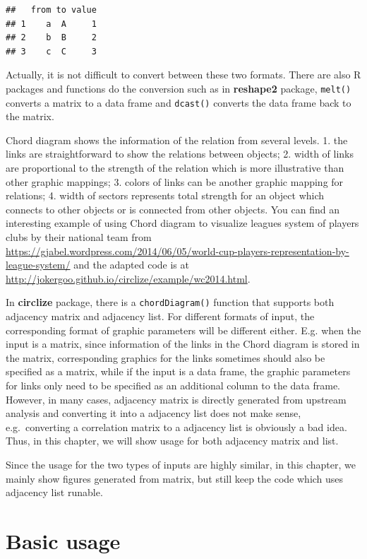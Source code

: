 \documentclass[]{book}
\begin{document}
\begin{verbatim}
##   from to value
## 1    a  A     1
## 2    b  B     2
## 3    c  C     3
\end{verbatim}

Actually, it is not difficult to convert between these two formats.
There are also R packages and functions do the conversion such as in
\textbf{reshape2} package, \texttt{melt()} converts a matrix to a data
frame and \texttt{dcast()} converts the data frame back to the matrix.

Chord diagram shows the information of the relation from several levels.
1. the links are straightforward to show the relations between objects;
2. width of links are proportional to the strength of the relation which
is more illustrative than other graphic mappings; 3. colors of links can
be another graphic mapping for relations; 4. width of sectors represents
total strength for an object which connects to other objects or is
connected from other objects. You can find an interesting example of
using Chord diagram to visualize leagues system of players clubs by
their national team from
\url{https://gjabel.wordpress.com/2014/06/05/world-cup-players-representation-by-league-system/}
and the adapted code is at
\url{http://jokergoo.github.io/circlize/example/wc2014.html}.

In \textbf{circlize} package, there is a \texttt{chordDiagram()}
function that supports both adjacency matrix and adjacency list. For
different formats of input, the corresponding format of graphic
parameters will be different either. E.g. when the input is a matrix,
since information of the links in the Chord diagram is stored in the
matrix, corresponding graphics for the links sometimes should also be
specified as a matrix, while if the input is a data frame, the graphic
parameters for links only need to be specified as an additional column
to the data frame. However, in many cases, adjacency matrix is directly
generated from upstream analysis and converting it into a adjacency list
does not make sense, e.g.~converting a correlation matrix to a adjacency
list is obviously a bad idea. Thus, in this chapter, we will show usage
for both adjacency matrix and list.

Since the usage for the two types of inputs are highly similar, in this
chapter, we mainly show figures generated from matrix, but still keep
the code which uses adjacency list runable.

\section{Basic usage}\label{basic-usage-1}
\end{document}
